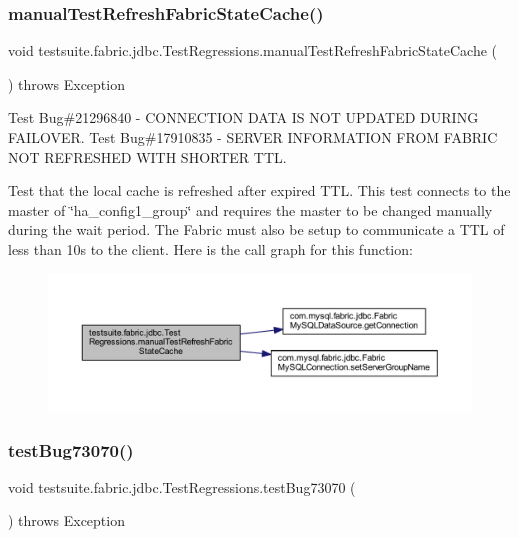 \subsubsection{\texorpdfstring{manual\+Test\+Refresh\+Fabric\+State\+Cache()}{manualTestRefreshFabricStateCache()}}
{\footnotesize\ttfamily void testsuite.\+fabric.\+jdbc.\+Test\+Regressions.\+manual\+Test\+Refresh\+Fabric\+State\+Cache (\begin{DoxyParamCaption}{ }\end{DoxyParamCaption}) throws Exception}

Test Bug\#21296840 -\/ C\+O\+N\+N\+E\+C\+T\+I\+ON D\+A\+TA IS N\+OT U\+P\+D\+A\+T\+ED D\+U\+R\+I\+NG F\+A\+I\+L\+O\+V\+ER. Test Bug\#17910835 -\/ S\+E\+R\+V\+ER I\+N\+F\+O\+R\+M\+A\+T\+I\+ON F\+R\+OM F\+A\+B\+R\+IC N\+OT R\+E\+F\+R\+E\+S\+H\+ED W\+I\+TH S\+H\+O\+R\+T\+ER T\+TL.

Test that the local cache is refreshed after expired T\+TL. This test connects to the master of \char`\"{}ha\+\_\+config1\+\_\+group\char`\"{} and requires the master to be changed manually during the wait period. The Fabric must also be setup to communicate a T\+TL of less than 10s to the client. Here is the call graph for this function\+:
\nopagebreak
\begin{figure}[H]
\begin{center}
\leavevmode
\includegraphics[width=350pt]{classtestsuite_1_1fabric_1_1jdbc_1_1_test_regressions_a97a6970c2925c2feddfeceac2e0a1d71_cgraph}
\end{center}
\end{figure}
\mbox{\label{classtestsuite_1_1fabric_1_1jdbc_1_1_test_regressions_a62bab22c5e479b7c4f07339b0085a73a}} 
\subsubsection{\texorpdfstring{test\+Bug73070()}{testBug73070()}}
{\footnotesize\ttfamily void testsuite.\+fabric.\+jdbc.\+Test\+Regressions.\+test\+Bug73070 (\begin{DoxyParamCaption}{ }\end{DoxyParamCaption}) throws Exception}

